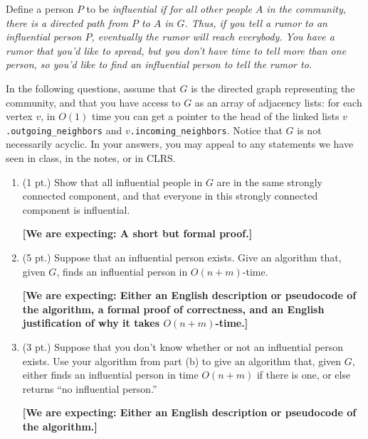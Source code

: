 \documentclass{article}
\begin{document}
\begin{enumerate}
    Define a person $P$ to be \em influential \em if for all other people $A$
    in the community, there is a directed path from $P$ to $A$ in $G$. Thus, if
    you tell a rumor to an influential person $P$, eventually the rumor will
    reach everybody. You have a rumor that you'd like to spread, but you don't
    have time to tell more than one person, so you'd like to find an
    influential person to tell the rumor to.
  
    In the following questions, assume that $G$ is the directed graph
    representing the community, and that you have access to $G$ as an array of
    adjacency lists: for each vertex $v$, in $O(1)$ time you can get a pointer
    to the head of the linked lists $v$\texttt{.outgoing\_neighbors} and
    $v$\texttt{.incoming\_neighbors}.  Notice that $G$ is not necessarily
    acyclic. In your answers, you may appeal to any statements we have seen in
    class, in the notes, or in CLRS.
  
    \begin{enumerate}
      \item (1 pt.) Show that all influential people in $G$ are in the same
        strongly connected component, and that everyone in this strongly
        connected component is influential.
      
      \textbf{[We are expecting: A short but formal proof.]}

      \item (5 pt.) Suppose that an influential person exists. Give an
        algorithm that, given $G$, finds an influential person in
        $O(n+m)$-time.

        \textbf{[We are expecting: Either an English description or pseudocode 
          of the algorithm, a formal proof of correctness, and an English
          justification of why it takes $O(n+m)$-time.]}

      \item (3 pt.) Suppose that you don't know whether or not an influential
        person exists. Use your algorithm from part (b) to give an algorithm
        that, given $G$, either finds an influential person in time $O(n+m)$
        if there is one, or else returns ``no influential person.''

        \textbf{[We are expecting: Either an English description or pseudocode 
          of the algorithm.]}
    \end{enumerate}
\end{enumerate}
\end{document}

